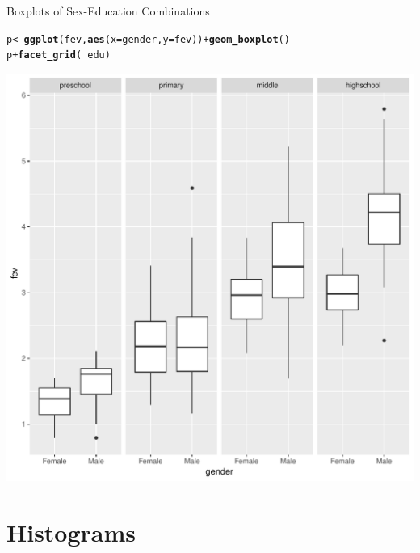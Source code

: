 \documentclass[10pt]{beamer}\usepackage[]{graphicx}\usepackage[]{color}
\makeatletter
\def\maxwidth{ %
  \ifdim\Gin@nat@width>\linewidth
    \linewidth
  \else
    \Gin@nat@width
  \fi
}
\newcommand{\hlopt}[1]{\textcolor[rgb]{0,0,0}{#1}}%
\newcommand{\hlstd}[1]{\textcolor[rgb]{0.345,0.345,0.345}{#1}}%
\newcommand{\hlkwb}[1]{\textcolor[rgb]{0.69,0.353,0.396}{#1}}%
\newcommand{\hlkwc}[1]{\textcolor[rgb]{0.333,0.667,0.333}{#1}}%
\newcommand{\hlkwd}[1]{\textcolor[rgb]{0.737,0.353,0.396}{\textbf{#1}}}%
\newenvironment{kframe}{%
 \def\at@end@of@kframe{}%
 \ifinner\ifhmode%
  \def\at@end@of@kframe{\end{minipage}}%
  \begin{minipage}{\columnwidth}%
 \fi\fi%
 \def\FrameCommand##1{\hskip\@totalleftmargin \hskip-\fboxsep
 \colorbox{shadecolor}{##1}\hskip-\fboxsep
     \hskip-\linewidth \hskip-\@totalleftmargin \hskip\columnwidth}%
 \MakeFramed {\advance\hsize-\width
   \@totalleftmargin\z@ \linewidth\hsize
   \@setminipage}}%
 {\par\unskip\endMakeFramed%
 \at@end@of@kframe}
\newenvironment{knitrout}{}{} %
\makeatother
\begin{document}
\begin{frame}[fragile]{Boxplots of Sex-Education Combinations}
\begin{knitrout}\small
{}\color{fgcolor}\begin{kframe}
\begin{alltt}
\hlstd{p} \hlkwb{<-} \hlkwd{ggplot}\hlstd{(fev,} \hlkwd{aes}\hlstd{(}\hlkwc{x} \hlstd{= gender,} \hlkwc{y} \hlstd{= fev))} \hlopt{+} \hlkwd{geom_boxplot}\hlstd{()}
\hlstd{p} \hlopt{+} \hlkwd{facet_grid}\hlstd{(}\hlopt{~}\hlstd{edu)}
\end{alltt}
\end{kframe}

{\centering \includegraphics[width=\maxwidth,height=.6\linewidth]{figure/unnamed-chunk-4-1} 

}



\end{knitrout}
\end{frame}



\section{Histograms}
\end{document}
